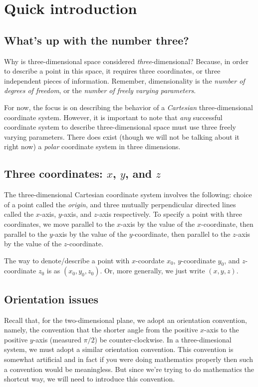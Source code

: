 \documentclass[10pt]{amsart}
\begin{document}
\section{Quick introduction}

\subsection{What's up with the number three?}

Why is three-dimensional space considered {\em three}-dimensional?
Because, in order to describe a point in this space, it requires three
coordinates, or three independent pieces of information. Remember,
dimensionality is the {\em number of degrees of freedom}, or the
{\em number of freely varying parameters}.

For now, the focus is on describing the behavior of a {\em Cartesian}
three-dimensional coordinate system. However, it is important to note
that {\em any} successful coordinate system to describe
three-dimensional space must use three freely varying
parameters. There does exist (though we will not be talking about it
right now) a {\em polar} coordinate system in three dimensions.

\subsection{Three coordinates: $x$, $y$, and $z$}

The three-dimensional Cartesian coordinate system involves the
following: choice of a point called the {\em origin}, and three
mutually perpendicular directed lines called the $x$-axis, $y$-axis,
and $z$-axis respectively. To specify a point with three coordinates,
we move parallel to the $x$-axis by the value of the $x$-coordinate,
then parallel to the $y$-axis by the value of the $y$-coordinate, then
parallel to the $z$-axis by the value of the $z$-coordinate.

The way to denote/describe a point with $x$-coordate $x_0$,
$y$-coordinate $y_0$, and $z$-coordinate $z_0$ is as
$(x_0,y_0,z_0)$. Or, more generally, we just write $(x,y,z)$.
\subsection{Orientation issues}

Recall that, for the two-dimensional plane, we adopt an orientation
convention, namely, the convention that the shorter angle from the
positive $x$-axis to the positive $y$-axis (measured $\pi/2$) be
counter-clockwise. In a three-dimesional system, we must adopt a
similar orientation convention. This convention is somewhat artificial
and in fact if you were doing mathematics properly then such a
convention would be meaningless. But since we're trying to do
mathematics the shortcut way, we will need to introduce this
convention.
\end{document}
